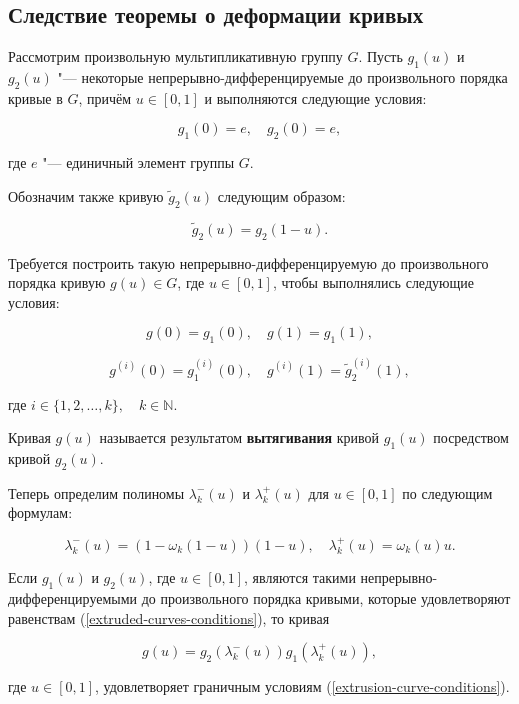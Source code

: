\subsection*{Следствие теоремы о деформации кривых}

Рассмотрим произвольную мультипликативную группу $G$. Пусть $g_1(u)$ и $g_2(u)$ "--- некоторые
непрерывно-дифференцируемые до произвольного порядка кривые в $G$, причём $u \in [0,1]$ и выполняются следующие условия:

\begin{equation}
g_1(0)=e, \quad g_2(0)=e,
\label{extruded-curves-conditions}
\end{equation}

\noindent где $e$ "--- единичный элемент группы $G$.

Обозначим также кривую $\tilde g_2(u)$ следующим образом:

$$
\tilde g_2(u)=g_2(1-u).
$$

Требуется построить такую непрерывно-дифференцируемую до произвольного порядка кривую $g(u)\in G$, где $u \in [0,1]$,
чтобы выполнялись следующие условия:

$$
g(0)=g_1(0), \quad g(1)=g_1(1),
$$

\begin{equation}
g^{(i)}(0)=g_1^{(i)}(0), \quad g^{(i)}(1)=\tilde g_2^{(i)}(1),
\label{extrusion-curve-conditions}
\end{equation}

\noindent где $i \in \{1,2,\dots,k\},\quad k\in\mathbb{N}$.

\begin{definition}
Кривая $g(u)$ называется результатом \textbf{вытягивания} кривой $g_1(u)$ посредством кривой $g_2(u)$.
\end{definition}

Теперь определим полиномы $\lambda_k^-(u)$ и $\lambda_k^+(u)$ для $u \in [0,1]$ по следующим формулам:

$$
\lambda_k^-(u)=(1-\omega_k(1-u))(1-u), \quad \lambda_k^+(u)=\omega_k(u)u.
$$

\begin{consequence}
Если $g_1(u)$ и $g_2(u)$, где $u \in [0,1]$, являются такими непрерывно-дифференцируемыми до произвольного порядка
кривыми, которые удовлетворяют равенствам (\ref{extruded-curves-conditions}), то кривая

$$
g(u)=g_2(\lambda_k^-(u))g_1(\lambda_k^+(u)),
$$

\noindent где $u \in [0,1]$, удовлетворяет граничным условиям (\ref{extrusion-curve-conditions}).
\end{consequence}

